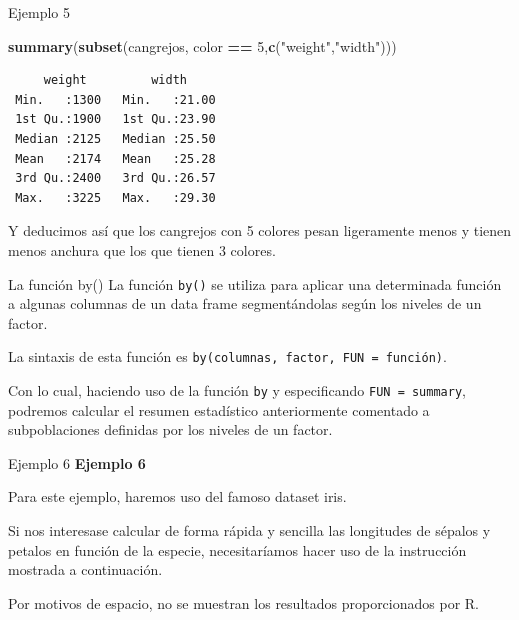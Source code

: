\documentclass[
  ignorenonframetext,
  aspectratio=169]{beamer}
\newenvironment{Shaded}{\begin{snugshade}}{\end{snugshade}}
\newcommand{\AttributeTok}[1]{\textcolor[rgb]{0.13,0.29,0.53}{#1}}
\newcommand{\DecValTok}[1]{\textcolor[rgb]{0.00,0.00,0.81}{#1}}
\newcommand{\FunctionTok}[1]{\textcolor[rgb]{0.13,0.29,0.53}{\textbf{#1}}}
\newcommand{\NormalTok}[1]{#1}
\newcommand{\SpecialCharTok}[1]{\textcolor[rgb]{0.81,0.36,0.00}{\textbf{#1}}}
\newcommand{\StringTok}[1]{\textcolor[rgb]{0.31,0.60,0.02}{#1}}
\begin{document}
\begin{frame}[fragile]{Ejemplo 5}
\label{ejemplo-5-13}
\begin{Shaded}
\begin{Highlighting}[]
\FunctionTok{summary}\NormalTok{(}\FunctionTok{subset}\NormalTok{(cangrejos, color }\SpecialCharTok{==} \DecValTok{5}\NormalTok{,}\FunctionTok{c}\NormalTok{(}\StringTok{"weight"}\NormalTok{,}\StringTok{"width"}\NormalTok{)))}
\end{Highlighting}
\end{Shaded}

\begin{verbatim}
     weight         width      
 Min.   :1300   Min.   :21.00  
 1st Qu.:1900   1st Qu.:23.90  
 Median :2125   Median :25.50  
 Mean   :2174   Mean   :25.28  
 3rd Qu.:2400   3rd Qu.:26.57  
 Max.   :3225   Max.   :29.30  
\end{verbatim}

Y deducimos así que los cangrejos con 5 colores pesan ligeramente menos
y tienen menos anchura que los que tienen 3 colores.
\end{frame}

\begin{frame}[fragile]{La función by()}
\label{la-funciuxf3n-by}
La función \texttt{by()} se utiliza para aplicar una determinada función
a algunas columnas de un data frame segmentándolas según los niveles de
un factor.

La sintaxis de esta función es
\texttt{by(columnas,\ factor,\ FUN\ =\ función)}.

Con lo cual, haciendo uso de la función \texttt{by} y especificando
\texttt{FUN\ =\ summary}, podremos calcular el resumen estadístico
anteriormente comentado a subpoblaciones definidas por los niveles de un
factor.
\end{frame}

\begin{frame}[fragile]{Ejemplo 6}
\label{ejemplo-6}
\textbf{Ejemplo 6}

Para este ejemplo, haremos uso del famoso dataset iris.

Si nos interesase calcular de forma rápida y sencilla las longitudes de
sépalos y petalos en función de la especie, necesitaríamos hacer uso de
la instrucción mostrada a continuación.

Por motivos de espacio, no se muestran los resultados proporcionados por
R.

\begin{Shaded}
\end{Shaded}
\end{frame}
\end{document}
